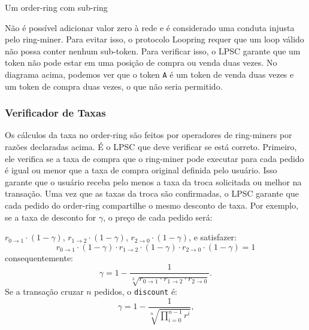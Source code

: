 \documentclass[UTF8,nofonts]{article}
\makeatletter
\newenvironment{figurehere}
 {\def\@captype{figure}}
 {}
\makeatother
\begin{document}
\begin{multicols}{2}
\begin{center}
\begin{figurehere}
\begin{tikzpicture}
\end{tikzpicture}

\caption{Um order-ring com sub-ring}
\label{fig:subring}
\end{figurehere}
\end{center}

Não é possível adicionar valor zero à rede e é considerado uma conduta injusta pelo ring-miner. Para evitar isso, o protocolo Loopring requer que um loop válido não possa conter nenhum sub-token. Para verificar isso, o LPSC garante que um token não pode estar em uma posição de compra ou venda duas vezes. No diagrama acima, podemos ver que o token \verb|A| é um token de venda duas vezes e um token de compra duas vezes, o que não seria permitido. 


\subsubsection{Verificador de Taxas\label{sec:fill_rate_check}}


Os cálculos da taxa no order-ring são feitos por operadores de ring-miners por razões declaradas acima. É o LPSC que deve verificar se está correto. Primeiro, ele verifica se a taxa de compra que o ring-miner pode executar para cada pedido é igual ou menor que a taxa de compra original definida pelo usuário. Isso garante que o usuário receba pelo menos a taxa da troca solicitada ou melhor na transação. Uma vez que as taxas da troca são confirmadas, o LPSC garante que cada pedido do order-ring compartilhe o mesmo desconto de taxa. Por exemplo, se a taxa de desconto for $\gamma$, o preço de cada pedido será:

$r_{0\rightarrow 1} \cdot (1-\gamma)$, $r_{1\rightarrow 2} \cdot (1-\gamma)$, $r_{2 \rightarrow 0} \cdot (1-\gamma)$, e satisfazer: 
\begin{equation}
r_{0\rightarrow 1} \cdot (1-\gamma)\cdot r_{1\rightarrow 2} \cdot (1-\gamma) \cdot r_{2 \rightarrow 0} \cdot (1-\gamma) = 1
\end{equation}
consequentemente: 
\begin{equation}
\gamma = 1- \frac{1}{\sqrt[3]{r_{0\rightarrow 1} \cdot r_{1\rightarrow 2} \cdot r_{2\rightarrow 0}}}\text{.}
\end{equation}
Se a transação cruzar $n$ pedidos, o \texttt{discount} é: 
\begin{equation}
\gamma = 1- \frac{1}{\sqrt[n]{\prod_{i=0}^{n-1} r^i}} \text{,}
\end{equation}


\end{multicols}
\end{document}
